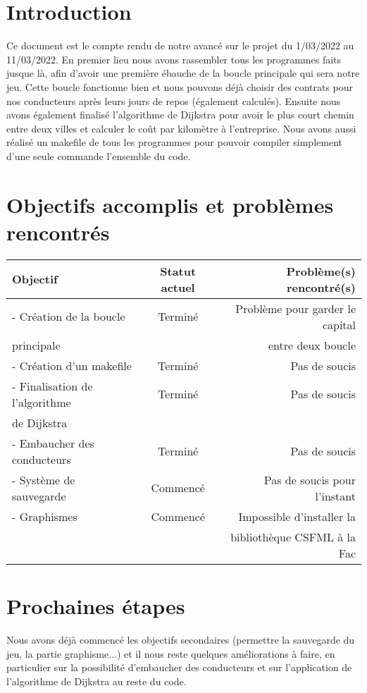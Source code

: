 \documentclass[a4paper, 12pt]{article}
\begin{document}
\newpage



\section*{Introduction}
      Ce document est le compte rendu de notre avancé sur le projet du 1/03/2022 au 11/03/2022. En premier lieu nous avons rassembler tous les programmes faits jusque là, afin d'avoir une première ébauche de la boucle principale qui sera notre jeu. Cette boucle fonctionne bien et nous pouvons déjà choisir des contrats pour nos conducteurs après leurs jours de repos (également calculés). Ensuite nous avons également finalisé l'algorithme de Dijkstra pour avoir le plus court chemin entre deux villes et calculer le coût par kilomètre à l'entreprise. Nous avons aussi réalisé un makefile de tous les programmes pour pouvoir compiler simplement d'une seule commande l'ensemble du code.

\section{Objectifs accomplis et problèmes rencontrés}
     \begin{tabular}{|l|c|r|}
  \hline
  Objectif & Statut actuel & Problème(s) rencontré(s) \\
  \hline
   - Création de la boucle & Terminé & Problème pour garder le capital\\
   principale && entre deux boucle \\
   - Création d'un makefile & Terminé & Pas de soucis\\
   - Finalisation de l'algorithme & Terminé & Pas de soucis\\
   de Dijkstra &&\\
   - Embaucher des conducteurs & Terminé & Pas de soucis \\
   - Système de sauvegarde & Commencé & Pas de soucis pour l'instant\\
   - Graphismes & Commencé & Impossible d'installer la\\
   &&bibliothèque CSFML à la Fac\\
  

  \hline
\end{tabular}
\section{Prochaines étapes}
    Nous avons déjà commencé les objectifs secondaires (permettre la sauvegarde du jeu, la partie graphisme...) et il nous reste quelques améliorations à faire, en particulier sur la possibilité d'embaucher des conducteurs et sur l'application de l'algorithme de Dijkstra au reste du code.
    
\end{document}
